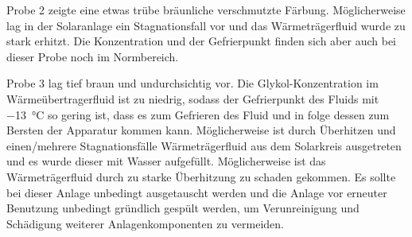 Probe 2 zeigte eine etwas trübe bräunliche verschmutzte Färbung. Möglicherweise lag in der Solaranlage ein Stagnationsfall vor und das Wärmeträgerfluid wurde zu stark erhitzt. Die Konzentration und der Gefrierpunkt finden sich aber auch bei dieser Probe noch im Normbereich. 

Probe 3 lag tief braun und undurchsichtig vor.  Die Glykol-Konzentration im Wärmeübertragerfluid ist zu niedrig, sodass der Gefrierpunkt des Fluids mit \SI{-13}{\celsius} so gering ist, dass es zum Gefrieren des Fluid und in folge dessen zum Bersten der Apparatur kommen kann. Möglicherweise ist durch Überhitzen und einen/mehrere Stagnationsfälle Wärmeträgerfluid aus dem Solarkreis ausgetreten und es wurde dieser mit Wasser aufgefüllt. Möglicherweise ist das Wärmeträgerfluid durch zu starke Überhitzung zu schaden gekommen. Es sollte bei dieser Anlage unbedingt ausgetauscht werden und die Anlage vor erneuter Benutzung unbedingt gründlich gespült werden, um Verunreinigung und Schädigung weiterer Anlagenkomponenten zu vermeiden. 